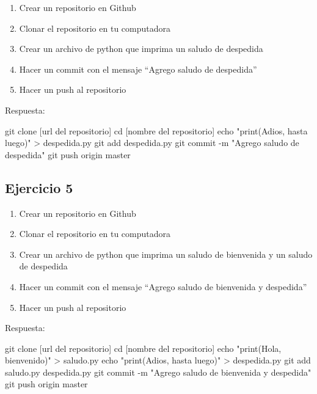 \documentclass[
  a4paper,
  DIV=11,
  numbers=noendperiod,
  onepage,
  openany]{scrreprt}
\newenvironment{Shaded}{\begin{snugshade}}{\end{snugshade}}
\newcommand{\AttributeTok}[1]{\textcolor[rgb]{0.40,0.45,0.13}{#1}}
\newcommand{\BuiltInTok}[1]{\textcolor[rgb]{0.00,0.23,0.31}{#1}}
\newcommand{\FunctionTok}[1]{\textcolor[rgb]{0.28,0.35,0.67}{#1}}
\newcommand{\NormalTok}[1]{\textcolor[rgb]{0.00,0.23,0.31}{#1}}
\newcommand{\OperatorTok}[1]{\textcolor[rgb]{0.37,0.37,0.37}{#1}}
\newcommand{\StringTok}[1]{\textcolor[rgb]{0.13,0.47,0.30}{#1}}
\providecommand{\tightlist}{%
  \setlength{\itemsep}{0pt}\setlength{\parskip}{0pt}}\usepackage{longtable,booktabs,array}
\begin{document}
\begin{tcolorbox}
\begin{enumerate}
\def\labelenumi{\arabic{enumi}.}
\tightlist
\item
  Crear un repositorio en Github
\item
  Clonar el repositorio en tu computadora
\item
  Crear un archivo de python que imprima un saludo de despedida
\item
  Hacer un commit con el mensaje ``Agrego saludo de despedida''
\item
  Hacer un push al repositorio
\end{enumerate}

Respuesta:

\begin{Shaded}
\begin{Highlighting}[]
\FunctionTok{git}\NormalTok{ clone [url del repositorio]}
\BuiltInTok{cd}\NormalTok{ [nombre del repositorio]}
\BuiltInTok{echo} \StringTok{"print(\textquotesingle{}Adios, hasta luego\textquotesingle{})"} \OperatorTok{\textgreater{}}\NormalTok{ despedida.py}
\FunctionTok{git}\NormalTok{ add despedida.py}
\FunctionTok{git}\NormalTok{ commit }\AttributeTok{{-}m} \StringTok{"Agrego saludo de despedida"}
\FunctionTok{git}\NormalTok{ push origin master}
\end{Highlighting}
\end{Shaded}

\subsection{Ejercicio 5}\label{ejercicio-5}

\begin{enumerate}
\def\labelenumi{\arabic{enumi}.}
\tightlist
\item
  Crear un repositorio en Github
\item
  Clonar el repositorio en tu computadora
\item
  Crear un archivo de python que imprima un saludo de bienvenida y un
  saludo de despedida
\item
  Hacer un commit con el mensaje ``Agrego saludo de bienvenida y
  despedida''
\item
  Hacer un push al repositorio
\end{enumerate}

Respuesta:

\begin{Shaded}
\begin{Highlighting}[]
\FunctionTok{git}\NormalTok{ clone [url del repositorio]}
\BuiltInTok{cd}\NormalTok{ [nombre del repositorio]}
\BuiltInTok{echo} \StringTok{"print(\textquotesingle{}Hola, bienvenido\textquotesingle{})"} \OperatorTok{\textgreater{}}\NormalTok{ saludo.py}
\BuiltInTok{echo} \StringTok{"print(\textquotesingle{}Adios, hasta luego\textquotesingle{})"} \OperatorTok{\textgreater{}}\NormalTok{ despedida.py}
\FunctionTok{git}\NormalTok{ add saludo.py despedida.py}
\FunctionTok{git}\NormalTok{ commit }\AttributeTok{{-}m} \StringTok{"Agrego saludo de bienvenida y despedida"}
\FunctionTok{git}\NormalTok{ push origin master}
\end{Highlighting}
\end{Shaded}


\end{tcolorbox}
\end{document}
